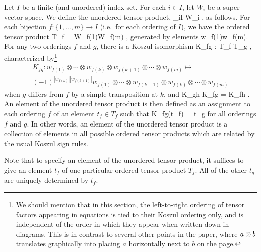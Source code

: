 Let $I$ be a finite (and unordered) index set.
For each $i\in I$, let $W_i$ be a super vector space.
We define the unordered tensor product,
\be
	\bigotimes_{i\in I} W_i ,
\ee
as follows.
For each bijection $f: \{1, \ldots,m\} \to I$ (i.e.\ for each ordering of $I$),
we have the ordered tensor product
\be
	T_f = W_{f(1)}\otimes\cdots\otimes W_{f(m)} ,
\ee
generated by elements
\be
	w_{f(1)}\otimes\cdots\otimes w_{f(m)}.
\ee
For any two orderings $f$ and $g$, there is a Koszul isomorphism
\be
	K_{fg} : T_f \to T_g ,
\ee
characterized by\footnote{
We should mention that in this section, 
the left-to-right ordering of tensor factors appearing in equations is tied to their Koszul ordering only, and
is independent of the order in which they appear when written down in diagrams. 
This is in contrast to several other points in the 
paper, where $a\otimes b$ translates graphically into placing $a$ horizontally next to $b$ on the page.
} 
\begin{multline}
	K_{fg} : w_{f(1)}\otimes\cdots\otimes w_{f(k)} \otimes w_{f(k+1)} \otimes \cdots \otimes w_{f(m)} \mapsto \\
				(-1)^{|w_{f(k)}||w_{f(k+1)}|} w_{f(1)}\otimes\cdots\otimes w_{f(k+1)} \otimes w_{f(k)} \otimes \cdots \otimes w_{f(m)}
\end{multline}
when $g$ differs from $f$ by a simple transposition at $k$, and
\be
	K_{gh} \circ K_{fg} = K_{fh} .
\ee
An element of the unordered tensor product is then defined as an assignment to each ordering $f$ of an element $t_f\in T_f$
such that
\be
	K_{fg}(t_f) = t_g
\ee
for all orderings $f$ and $g$.
In other words, an element of the unordered tensor product is a collection of elements in all 
possible ordered tensor products which are related by the usual Koszul sign rules.


Note that to specify an element of the unordered tensor product, it suffices to give an element $t_f$ of one
particular ordered tensor product $T_f$.
All of the other $t_g$ are uniquely determined by $t_f$.

